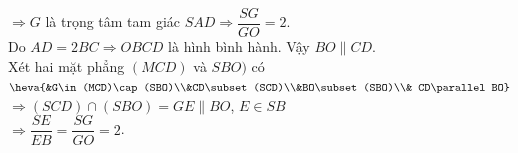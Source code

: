 \begin{bt}
{\begin{enumerate}
        $\Rightarrow G$ là trọng tâm tam giác $SAD \Rightarrow \dfrac{SG}{GO}=2.$\\
        Do $AD=2BC\Rightarrow OBCD$ là hình bình hành. Vậy $BO\parallel CD$.\\
        Xét hai mặt phẳng $(MCD)$ và $SBO)$ có\\
        $\heva{&G\in (MCD)\cap (SBO)\\&CD\subset (SCD)\\&BO\subset (SBO)\\& CD\parallel BO}$\\
        $\Rightarrow (SCD)\cap (SBO)=GE\parallel BO$, $E\in SB$\\
        $\Rightarrow \dfrac{SE}{EB}=\dfrac{SG}{GO}=2$.
        \end{enumerate}	
	}
\end{bt}

